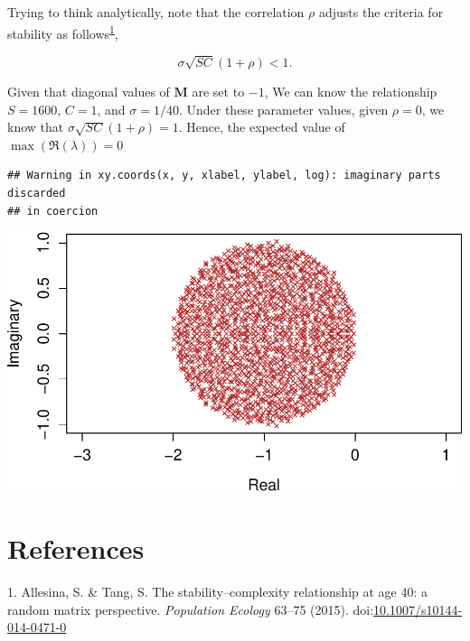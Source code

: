 \documentclass[]{article}
\begin{document}
Trying to think analytically, note that the correlation \(\rho\) adjusts
the criteria for stability as
follows\textsuperscript{\protect\hyperlink{ref-Allesina2015a}{1}},

\[\sigma\sqrt{SC}\left(1 + \rho\right) < 1.\]

Given that diagonal values of \(\textbf{M}\) are set to \(-1\), We can
know the relationship \(S = 1600\), \(C = 1\), and \(\sigma = 1/40\).
Under these parameter values, given \(\rho = 0\), we know that
\(\sigma\sqrt{SC}\left(1 + \rho\right) = 1\). Hence, the expected value
of \(\max(\Re(\lambda)) = 0\)

\begin{verbatim}
## Warning in xy.coords(x, y, xlabel, ylabel, log): imaginary parts discarded
## in coercion
\end{verbatim}

\includegraphics{revision_notes_files/figure-latex/unnamed-chunk-11-1.pdf}

\hypertarget{references}{%
\section*{References}\label{references}}

\hypertarget{refs}{}
\leavevmode\hypertarget{ref-Allesina2015a}{}%
1. Allesina, S. \& Tang, S. The stability--complexity relationship at
age 40: a random matrix perspective. \emph{Population Ecology} 63--75
(2015).
doi:\href{https://doi.org/10.1007/s10144-014-0471-0}{10.1007/s10144-014-0471-0}
\end{document}
